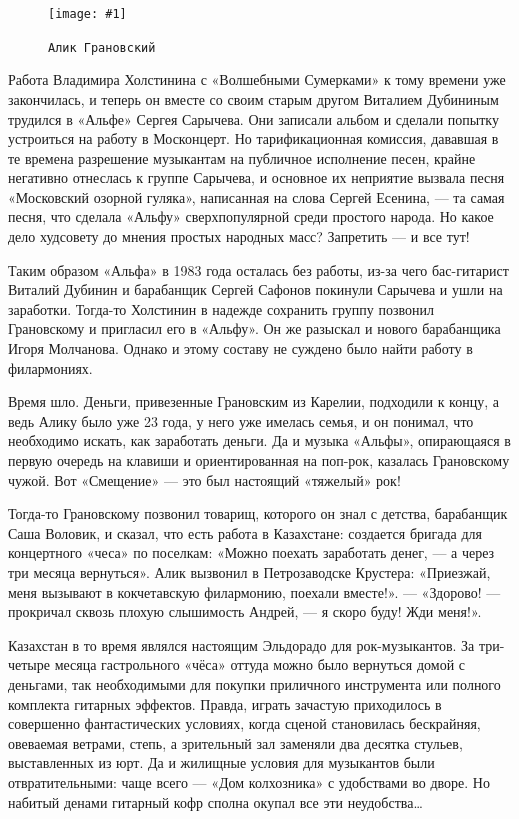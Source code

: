 \documentclass[10pt, twoside]{book}
\newcommand{\myincludegraphics}[1]{\texttt{[image: \#1]}}
\begin{document}
\begin{figure}
    \centering
    \myincludegraphics{Image09}
    \caption{\texttt{Алик Грановский}}
\end{figure}

Работа Владимира Холстинина с «Волшебными Сумерками» к тому времени уже закончилась, и теперь он вместе со своим старым
другом Виталием Дубининым трудился в «Альфе» Сергея Сарычева. Они записали альбом и сделали попытку устроиться на работу
в Москонцерт. Но тарификационная комиссия, дававшая в те времена разрешение музыкантам на публичное исполнение песен,
крайне негативно отнеслась к группе Сарычева, и основное их неприятие вызвала песня «Московский озорной гуляка»,
написанная на слова Сергей Есенина, — та самая песня, что сделала «Альфу» сверхпопулярной среди простого народа. Но
какое дело худсовету до мнения простых народных масс? Запретить — и все тут!

Таким образом «Альфа» в 1983 года осталась без работы, из-за чего бас-гитарист Виталий Дубинин и барабанщик Сергей
Сафонов покинули Сарычева и ушли на заработки. Тогда-то Холстинин в надежде сохранить группу позвонил Грановскому и
пригласил его в «Альфу». Он же разыскал и нового барабанщика Игоря Молчанова. Однако и этому составу не суждено было
найти работу в филармониях.

Время шло. Деньги, привезенные Грановским из Карелии, подходили к концу, а ведь Алику было уже 23 года, у него уже
имелась семья, и он понимал, что необходимо искать, как заработать деньги. Да и музыка «Альфы», опирающаяся в первую
очередь на клавиши и ориентированная на поп-рок, казалась Грановскому чужой. Вот «Смещение» — это был настоящий
«тяжелый» рок!

Тогда-то Грановскому позвонил товарищ, которого он знал с детства, барабанщик Саша Воловик, и сказал, что есть работа в
Казахстане: создается бригада для концертного «чеса» по поселкам: «Можно поехать заработать денег, — а через три месяца
вернуться». Алик вызвонил в Петрозаводске Крустера: «Приезжай, меня вызывают в кокчетавскую филармонию, поехали
вместе!». — «Здорово! — прокричал сквозь плохую слышимость Андрей, — я скоро буду! Жди меня!».

Казахстан в то время являлся настоящим Эльдорадо для рок-музыкантов. За три-четыре месяца гастрольного «чёса» оттуда
можно было вернуться домой с деньгами, так необходимыми для покупки приличного инструмента или полного комплекта
гитарных эффектов. Правда, играть зачастую приходилось в совершенно фантастических условиях, когда сценой становилась
бескрайняя, овеваемая ветрами, степь, а зрительный зал заменяли два десятка стульев, выставленных из юрт. Да и жилищные
условия для музыкантов были отвратительными: чаще всего — «Дом колхозника» с удобствами во дворе. Но набитый денами
гитарный кофр сполна окупал все эти неудобства\ldots
\end{document}
